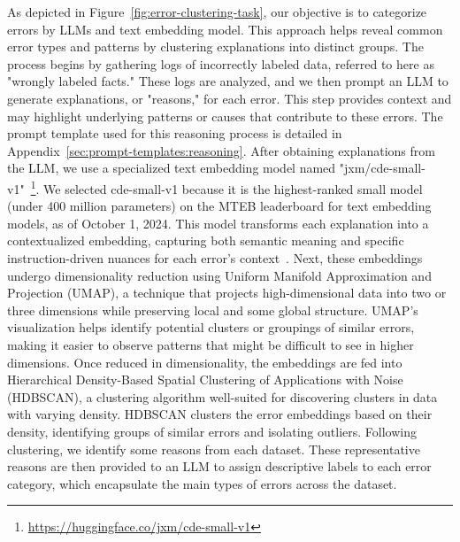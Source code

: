 As depicted in Figure~\ref{fig:error-clustering-task}, our objective is to categorize errors by LLMs and text embedding model.
This approach helps reveal common error types and patterns by clustering explanations into distinct groups.
The process begins by gathering logs of incorrectly labeled data, referred to here as "wrongly labeled facts."
These logs are analyzed, and we then prompt an LLM to generate explanations, or "reasons," for each error.
This step provides context and may highlight underlying patterns or causes that contribute to these errors.
The prompt template used for this reasoning process is detailed in Appendix~\ref{sec:prompt-templates:reasoning}.
After obtaining explanations from the LLM, we use a specialized text embedding model named "jxm/cde-small-v1"~\footnote{\url{https://huggingface.co/jxm/cde-small-v1}}.
We selected cde-small-v1 because it is the highest-ranked small model (under 400 million parameters) on the MTEB leaderboard for text embedding models, as of October 1, 2024.
This model transforms each explanation into a contextualized embedding, capturing both semantic meaning and specific instruction-driven nuances for each error's context~\cite{morris2024contextualdocumentembeddings}.
Next, these embeddings undergo dimensionality reduction using Uniform Manifold Approximation and Projection (UMAP), a technique that projects high-dimensional data into two or three dimensions while preserving local and some global structure.
UMAP's visualization helps identify potential clusters or groupings of similar errors, making it easier to observe patterns that might be difficult to see in higher dimensions.
Once reduced in dimensionality, the embeddings are fed into Hierarchical Density-Based Spatial Clustering of Applications with Noise (HDBSCAN), a clustering algorithm well-suited for discovering clusters in data with varying density.
HDBSCAN clusters the error embeddings based on their density, identifying groups of similar errors and isolating outliers.
Following clustering, we identify some reasons from each dataset.
These representative reasons are then provided to an LLM to assign descriptive labels to each error category, which encapsulate the main types of errors across the dataset.

